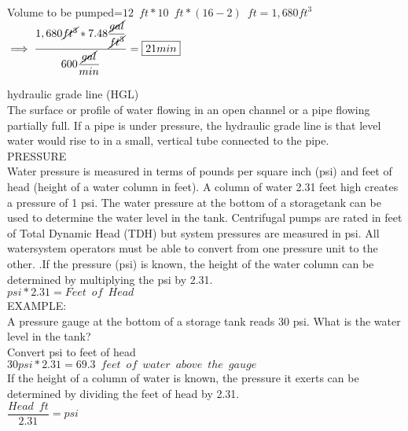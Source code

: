 \documentclass{article}
\begin{document}
\begin{enumerate}
\begin{enumerate}
\\
Volume to be pumped=$12 \enspace ft*10 \enspace ft *(16-2)\enspace ft=1,680ft^3$\\
\vspace{0.3cm}
$\implies \dfrac{1,680\cancel{ft^3}*7.48\dfrac{\cancel{gal}}{\cancel{ft^3}}}{600\dfrac{\cancel{gal}}{min}}=\boxed{21min}$
\end{enumerate}
\end{enumerate}

hydraulic grade line (HGL)\\
The surface or profile of water flowing in an open channel or a pipe flowing partially full. If a pipe is under pressure, the hydraulic grade line is that level water would rise to in a small, vertical tube connected to the pipe.\\

PRESSURE\\
Water pressure is measured in terms of pounds per square inch (psi) and feet of head (height of a water column in feet). A column of water 2.31 feet high creates a pressure of 1 psi. The water pressure at the bottom of a storagetank can be used to determine the water level in the tank.  Centrifugal pumps are rated in feet of Total Dynamic Head (TDH) but system pressures are measured in psi. All watersystem operators must be able to convert from one pressure unit to the other. .If the pressure (psi) is known, the height of the water column can be determined by multiplying the psi by 2.31.\\
$psi * 2.31 = Feet \enspace of \enspace Head$\\
EXAMPLE:\\
A pressure gauge at the bottom of a storage tank reads 30 psi. What is the water level in the tank?\\
Convert psi to feet of head\\
$30 psi * 2.31 = 69.3 \enspace feet \enspace of \enspace water \enspace above \enspace the \enspace gauge$\\
If the height of a column of water is known, the pressure it exerts can be determined by dividing the feet of head by 2.31.\\
$\dfrac{Head \enspace ft}{2.31} = psi$\\
\end{document}
